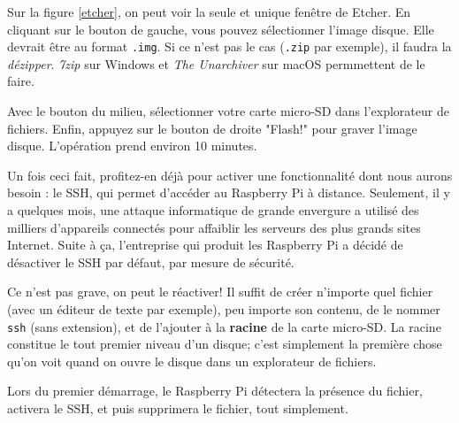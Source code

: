 Sur la figure \ref{etcher}, on peut voir la seule et unique fenêtre de Etcher. En cliquant sur le bouton de gauche, vous pouvez sélectionner l'image disque. Elle devrait être au format \texttt{.img}. Si ce n'est pas le cas (\texttt{.zip} par exemple), il faudra la \textit{dézipper}. \textit{7zip} sur Windows et \textit{The Unarchiver} sur macOS permmettent de le faire.

Avec le bouton du milieu, sélectionner votre carte micro-SD dans l'explorateur de fichiers. Enfin, appuyez sur le bouton de droite "Flash!" pour graver l'image disque. L'opération prend environ 10 minutes.

Un fois ceci fait, profitez-en déjà pour activer une fonctionnalité dont nous aurons besoin : le SSH, qui permet d'accéder au Raspberry Pi à distance. Seulement, il y a quelques mois, une attaque informatique de grande envergure a utilisé des milliers d'appareils connectés pour affaiblir les serveurs des plus grands sites Internet. Suite à ça, l'entreprise qui produit les Raspberry Pi a décidé de désactiver le SSH par défaut, par mesure de sécurité.

Ce n'est pas grave, on peut le réactiver! Il suffit de créer n'importe quel fichier (avec un éditeur de texte par exemple), peu importe son contenu, de le nommer \texttt{ssh} (sans extension), et de l'ajouter à la \textbf{racine} de la carte micro-SD. La racine constitue le tout premier niveau d'un disque; c'est simplement la première chose qu'on voit quand on ouvre le disque dans un explorateur de fichiers.

Lors du premier démarrage, le Raspberry Pi détectera la présence du fichier, activera le SSH, et puis supprimera le fichier, tout simplement.